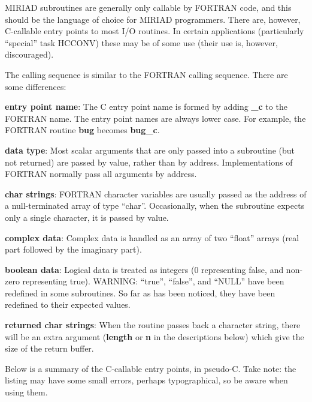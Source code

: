 MIRIAD subroutines are generally only callable by FORTRAN code,
and this should be the language of choice for MIRIAD programmers.
There are, however, C-callable entry points to most I/O routines. In certain
applications (particularly ``special'' task HCCONV) these may be of some
use (their use is, however, discouraged).

The calling sequence is similar to the FORTRAN calling sequence.
There are some differences:

{\bf entry point name}:  The C entry point name is formed by adding
{\bf \_c} to the FORTRAN name. The entry point names are always lower case.
For example, the FORTRAN routine {\bf bug} becomes {\bf bug\_c}.

{\bf data type}:  Most scalar arguments that are only passed into a
subroutine (but not returned) are passed by value, rather than by address.
Implementations of FORTRAN normally pass all arguments by address.

{\bf char strings}:  FORTRAN character variables are usually passed as the
address of a null-terminated array of type ``char''. Occasionally, when
the subroutine expects only a single character, it is passed by value.

{\bf complex data}:  Complex data is handled as an array of two ``float''
arrays (real part followed by the imaginary part).

{\bf boolean data}:  Logical data is treated as integers (0 representing
false, and non-zero representing true).  WARNING:  ``true'', ``false'',
and ``NULL'' have been redefined in some subroutines.  So far as has
been noticed, they have been redefined to their expected values.

{\bf returned char strings}:  When the routine passes back a character
string, there will be an extra argument ({\bf length} or {\bf n} in the
descriptions below) which give the size of the return buffer.

Below is a summary of the C-callable entry points, in pseudo-C.  Take
note:  the listing may have some small errors, perhaps typographical, so
be aware when using them.

